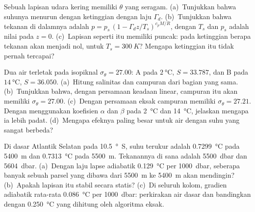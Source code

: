 \begin{exercise}[$\star\star\star$]\label{exo:b1:fluid-envelopes-structure:10}
Sebuah lapisan udara kering memiliki  $\theta$ yang seragam. (a)~Tunjukkan
bahwa suhunya menurun dengan ketinggian dengan laju $\Gamma_d$. (b)~Tunjukkan bahwa
tekanan di dalamnya adalah $p = p_s\,(1 - \Gamma_d z/T_s)^{c_pM/R}$, dengan $T_s$ dan
$p_s$ adalah nilai pada $z = 0$. (c)~Lapisan seperti itu memiliki puncak: pada
ketinggian berapa tekanan akan menjadi nol, untuk $T_s = \qty{300}{K}$? Mengapa
ketinggian itu tidak pernah tercapai?
\end{exercise}

\begin{exercise}[$\star\star\star$]\label{exo:b1:fluid-envelopes-structure:11}
Dua air terletak pada isopiknal $\sigma_\theta = 27.00$: A pada $\qty{2}{\celsius}$,
$S = 33.787$, dan B pada $\qty{14}{\celsius}$, $S = 36.050$. (a)~Hitung salinitas dan
 campuran dari bagian yang sama. (b)~Tunjukkan bahwa, dengan persamaan
keadaan linear, campuran itu akan memiliki $\sigma_\theta = 27.00$. (c)~Dengan
persamaan eksak campuran memiliki $\sigma_\theta = 27.21$. Dengan menggunakan koefisien
$\alpha$ dan $\beta$ pada \qty{2}{\celsius} dan \qty{14}{\celsius}, jelaskan mengapa
ia lebih padat. (d)~Mengapa efeknya paling besar untuk air dengan suhu yang sangat
berbeda?
\end{exercise}

\begin{exercise}[$\star\star\star$]\label{exo:b1:fluid-envelopes-structure:12}
Di dasar Atlantik Selatan pada \qty{10.5}{\degree S}, suhu terukur adalah
\qty{0.7299}{\celsius} pada \qty{5400}{m} dan \qty{0.7313}{\celsius} pada
\qty{5500}{m}. Tekanannya di sana adalah \qty{5500}{dbar} dan \qty{5604}{dbar}. (a)~Dengan
laju lapse adiabatik \qty{0.129}{\celsius} per \qty{1000}{dbar}, seberapa banyak sebuah
parsel yang dibawa dari \qty{5500}{m} ke \qty{5400}{m} akan mendingin? (b)~Apakah
lapisan itu stabil secara statis? (c)~Di seluruh kolom, gradien adiabatik rata-rata
\qty{0.086}{\celsius} per \qty{1000}{dbar}: perkirakan  air dasar dan
bandingkan dengan \qty{0.250}{\celsius} yang dihitung oleh algoritma eksak.
\end{exercise}

